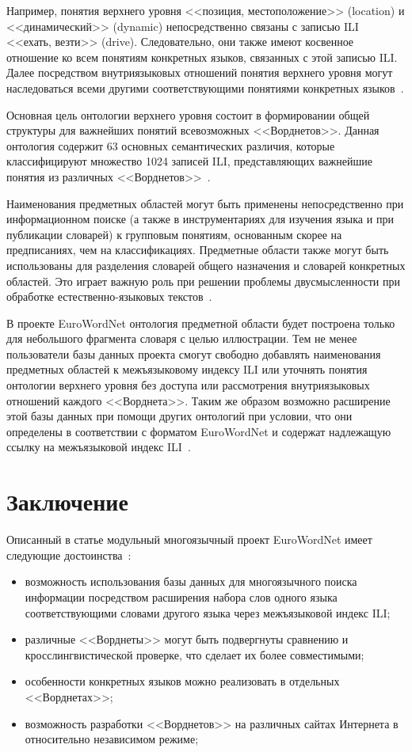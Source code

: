 \begin{multicols}{2}
     Например, понятия верхнего уровня <<позиция, местоположение>> 
(location) и <<динамический>> (dynamic) непосредственно связаны с записью 
ILI <<ехать, везти>> (drive). Следовательно, они также имеют косвенное 
отношение ко всем понятиям конкретных языков, связанных с этой записью 
ILI. Далее посредством внутриязыковых отношений понятия верхнего уровня 
могут наследоваться всеми другими соответствующими понятиями 
конкретных языков~\cite{4koz}. 
     
     Основная цель онтологии  верхнего уровня состо\-ит в формировании 
общей структуры для важней\-ших понятий всевозможных <<Ворднетов>>. %
Данная онтология содержит 63 основных семантических различия, которые 
классифицируют множество 1024 записей ILI, представляющих важнейшие 
понятия из различных <<Ворднетов>>~\cite{9koz}. 
     
     Наименования предметных областей могут быть применены 
непосредственно при информационном поиске (а также в инструментариях для 
изучения языка и при публикации словарей) к групповым понятиям, 
основанным скорее на предписаниях, чем на классификациях. Предметные 
области также могут быть использованы для разделения словарей общего 
назначения и словарей конкретных областей. Это играет важную роль при 
решении проблемы двусмысленности при обработке естест\-вен\-но-язы\-ко\-вых 
текстов~\cite{7koz}. 
     
     В проекте EuroWordNet онтология предметной области будет построена 
только для небольшого фрагмента словаря  с целью иллюстрации. Тем не 
менее пользователи базы данных проекта смогут свободно добавлять 
наименования предметных областей к межъязыковому индексу ILI или 
уточнять понятия онтологии верхнего уровня без доступа или рассмотрения 
внутриязыковых отношений каждого <<Ворднета>>. Таким же образом 
возможно расширение этой базы данных при помощи других онтологий при 
условии, что они определены в соответствии с форматом EuroWordNet и 
содержат надлежащую ссылку на межъязыковой индекс ILI~\cite{9koz}. 

     
     \section{Заключение}
     
     Описанный в статье модульный многоязычный проект EuroWordNet 
имеет следующие достоинства~\cite{4koz}:
\begin{itemize}
\item возможность использования базы данных для многоязычного 
поиска информации посредством расширения набора слов одного языка 
соответствующими словами другого языка через межъязыковой индекс 
ILI; 
\item различные <<Ворднеты>> могут быть подвергнуты сравнению и 
кросслингвистической проверке, что сделает их более совместимыми; 
\item особенности конкретных языков можно реализовать в отдельных 
<<Ворднетах>>; 
\item возможность разработки <<Ворднетов>> на различных сайтах 
Интернета в относительно независимом режиме; 


\end{itemize}
\end{multicols}
